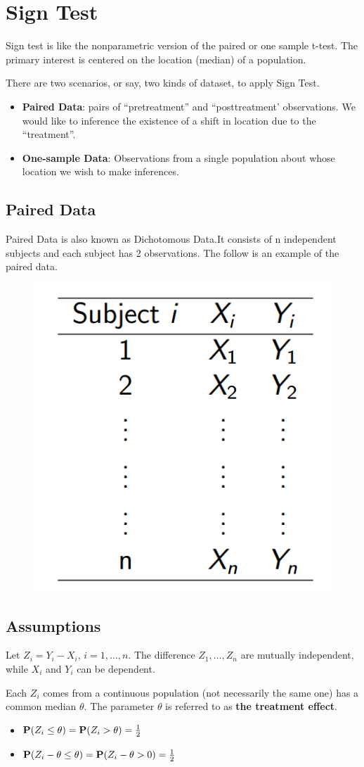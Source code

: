 \section{Sign Test}
Sign test is like the nonparametric version of the paired or one sample t-test. The primary interest is centered on the location (median) of a
population.

There are two scenarios, or say, two kinds of dataset, to apply Sign Test.
\begin{itemize}
	\item \textbf{Paired Data}: pairs of ``pretreatment'' and ``posttreatment'
observations. We would like to inference the existence of a shift in location due to the ``treatment''.
	\item \textbf{One-sample Data}: Observations from a single population about
whose location we wish to make inferences.
\end{itemize}

\subsection{Paired Data}

Paired Data is also known as Dichotomous Data.It consists
of n independent subjects and each subject has 2 observations. The follow is an example of the paired data.

\begin{figure}[H]
	\centering
	\includegraphics[width=0.2\linewidth]{fig/paired-data}
	\caption{}
	\label{fig:paired-data}
\end{figure}

\subsection{Assumptions}
Let $Z_i = Y_i - X_i$, $i = 1, \dots, n$. The difference $Z_1, \dots, Z_n$ are mutually independent, while $X_i$ and $Y_i$ can be dependent.

Each $Z_i$ comes from a continuous population (not necessarily the same one) has a common median $\theta$. The parameter $\theta$ is referred to as \textbf{the treatment effect}.
\begin{itemize}
	\item ${\mathbf P}(Z_i \le \theta) = {\mathbf P}(Z_i > \theta) = \frac{1}{2}$
	\item ${\mathbf P}(Z_i - \theta \le \theta) = {\mathbf P}(Z_i - \theta > 0) = \frac{1}{2}$
\end{itemize}

